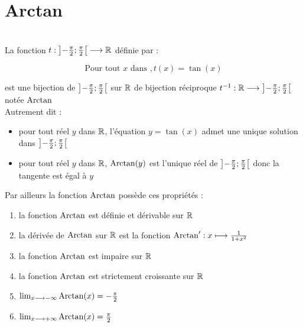 \section{Arctan}
\begin{defprop}
    ~\\
    La fonction \(t : \left]-\frac{\pi}{2};\frac{\pi}{2}\right[ \longrightarrow \mathbb{R}\) définie par :

    \[\text{Pour tout } x \text{ dans },t(x) = \tan(x)\] 
    
    est une bijection de \(\left]-\frac{\pi}{2};\frac{\pi}{2}\right[\) sur \(\mathbb{R}\) de bijection réciproque \(t^{-1} : \mathbb{R} \longrightarrow \left]-\frac{\pi}{2};\frac{\pi}{2}\right[\) notée \(\operatorname{Arctan}\)
    \\ Autrement dit : 
    \begin{itemize}
        \item pour tout réel \(y\) dans \(\mathbb{R}\), l'équation \(y=\tan(x)\) admet une unique solution dans \(\left]-\frac{\pi}{2};\frac{\pi}{2}\right[\)
        \item pour tout réel \(y\) dans \(\mathbb{R}\), \(\operatorname{Arctan} (y)\) est l'unique réel de \(\left]-\frac{\pi}{2};\frac{\pi}{2}\right[\) donc la tangente est égal à \(y\)
    \end{itemize}
    Par ailleurs la fonction \(\operatorname{Arctan}\) possède ces propriétés : 
    \begin{enumerate}
        \item la fonction \(\operatorname{Arctan}\) est définie et dérivable sur \(\mathbb{R}\)
        \item la dérivée de \(\operatorname{Arctan}\) sur \(\mathbb{R}\) est la fonction \(\operatorname{Arctan}' : x\longmapsto \frac{1}{1+x^2} \)
        \item la fonction \(\operatorname{Arctan}\) est impaire sur \(\mathbb{R}\)
        \item la fonction \(\operatorname{Arctan}\) est strictement croissante sur \(\mathbb{R}\)
        \item \(\lim_{x\longrightarrow-\infty} \operatorname{Arctan}(x) = -\frac{\pi}{2}\)
        \item \(\lim_{x\longrightarrow+\infty} \operatorname{Arctan}(x) = \frac{\pi}{2}\)
    \end{enumerate}
\end{defprop}

